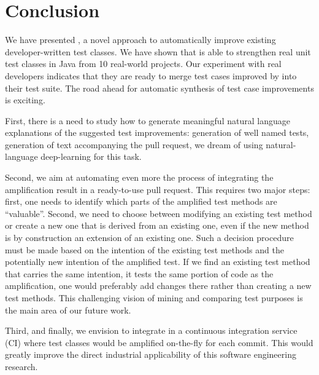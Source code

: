 \section{Conclusion}
\label{sec:conclusion}

We have presented \dspot, a novel approach to automatically improve existing developer-written test classes.
We have shown that \dspot is able to strengthen real unit test classes in Java from 10 real-world projects. 
Our experiment with real developers indicates that they are ready to merge test cases improved by \dspot into their test suite. 
The road ahead for automatic synthesis of test case improvements is exciting.

First, there is a need to study how to generate meaningful natural language explanations of the suggested test improvements: generation of well named tests, generation of text accompanying the pull request, we dream of using natural-language deep-learning for this task.

Second, we aim at automating even more the process of integrating the amplification result in a ready-to-use pull request. This requires two major steps: first, one needs to identify which parts of the amplified test methods are ``valuable''. 
Second, we need to choose between modifying an existing test method or create a new one that is derived from an existing one, even if the new method is by construction an extension of an existing one. 
Such a decision procedure must be made based on the intention of the existing test methods and the potentially new intention of the amplified test. If we find an existing test method that carries the same intention, \ie it tests the same portion of code as the amplification, one would preferably add changes there rather than creating a new test methods. This challenging vision of mining and comparing test purposes is the main area of our future work.

Third, and finally, we envision to integrate \dspot in a continuous integration service (CI) where test classes would be amplified on-the-fly for each commit. This would greatly improve the direct industrial applicability of this software engineering research.